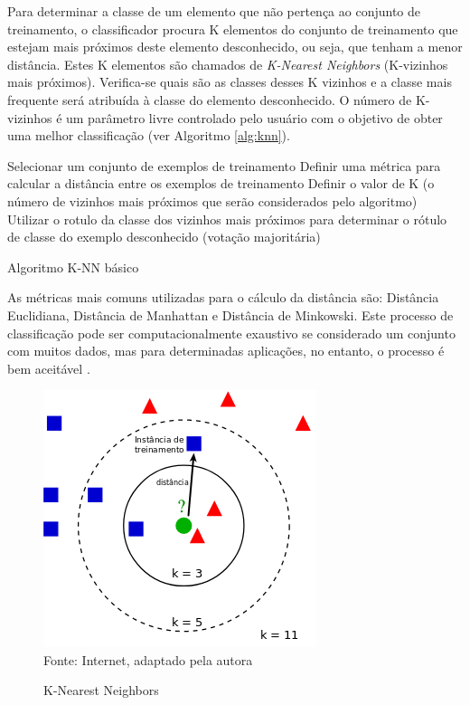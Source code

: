 Para determinar a classe de um elemento que não pertença ao conjunto de treinamento, o classificador procura K elementos do conjunto de treinamento que estejam mais próximos deste elemento desconhecido, ou seja, que tenham a menor distância. Estes K elementos são chamados de \textit{K-Nearest Neighbors} (K-vizinhos mais próximos). Verifica-se quais são as classes desses K vizinhos e a classe mais frequente será atribuída à classe do elemento desconhecido. O número de K-vizinhos é um parâmetro livre controlado pelo usuário com o objetivo de obter uma melhor classificação (ver Algoritmo \ref{alg:knn}).

\begin{algorithm}[!htb]
    \SetAlgoLined
        Selecionar um conjunto de exemplos de treinamento\; 
        Definir uma métrica para calcular a distância entre os exemplos de treinamento\;
        Definir o valor de K (o número de vizinhos mais próximos que serão considerados pelo algoritmo)\;
        Utilizar o rotulo da classe dos vizinhos mais próximos para determinar o rótulo de classe do exemplo desconhecido (votação majoritária)\;
    \caption{Algoritmo K-NN básico}
    \label{alg:knn}
\end{algorithm}

As métricas mais comuns utilizadas para o cálculo da distância são: Distância Euclidiana, Distância de Manhattan e Distância de Minkowski. Este processo de classificação pode ser computacionalmente exaustivo se considerado um conjunto com muitos dados, mas para determinadas aplicações, no entanto, o processo é bem aceitável \cite{knn2005}.
        
\begin{figure}[!htb]
     \centering
           \caption{K-Nearest Neighbors}\label{fig:knn} 
           \includegraphics[scale=0.80]{figuras/knn.png}
           \\Fonte: Internet, adaptado pela autora
\end{figure}
        

